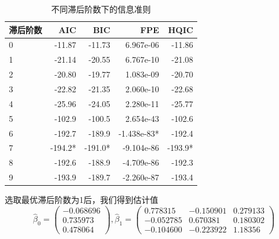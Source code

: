 \documentclass{article}
\begin{document}
    \begin{table}[h]
        \caption{不同滞后阶数下的信息准则}
        \label{tab:AIC BIC}
        \centering
        \begin{tabular}{lrrrr}
            \toprule
            滞后阶数 & AIC &       BIC&        FPE &       HQIC \\
            \midrule
            0 &    -11.87 &    -11.73 & 6.967e-06 &    -11.86 \\
            1 &    -21.14 &    -20.55 & 6.767e-10 &    -21.08 \\
            2 &    -20.80 &    -19.77 & 1.083e-09 &    -20.70 \\
            3 &    -22.82 &    -21.35 & 2.060e-10 &    -22.68 \\
            4 &    -25.96 &    -24.05 & 2.280e-11 &    -25.77 \\
            5 &    -102.9 &    -100.5 & 2.654e-43 &    -102.6 \\
            6 &    -192.7 &    -189.9 &-1.438e-83*&     -192.4 \\
            7 &   -194.2* &   -191.0* &-9.104e-86 &   -193.9* \\
            8 &    -192.6 &    -188.9 &-4.709e-86 &    -192.3 \\
            9 &    -193.9 &    -189.7 &-2.260e-87 &    -193.4 \\
            \bottomrule
        \end{tabular}
    \end{table}

    选取最优滞后阶数为1后，我们得到估计值
    \[\hat\beta_0=\begin{pmatrix}
        -0.068696 \\
        0.735973  \\
        0.478064
    \end{pmatrix},
    \hat\beta_1=\begin{pmatrix}
        0.778315 & -0.150901 & 0.279133\\
        -0.052785 & 0.670381 & 0.180302\\
        -0.104600 & -0.223922 & 1.18356
    \end{pmatrix}\]
\end{document}
